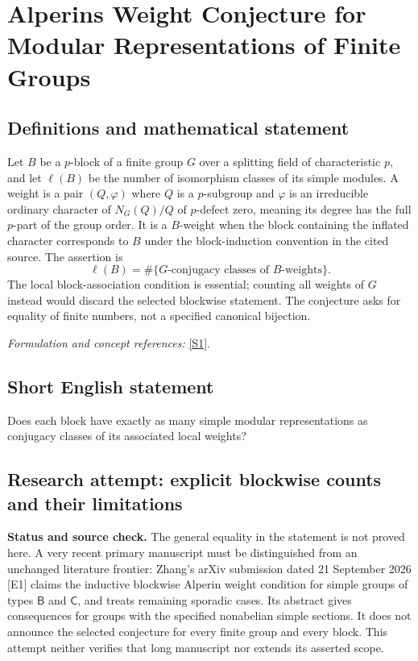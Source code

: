 \documentclass[11pt]{article}
\begin{document}
\section*{\texorpdfstring{Alperins Weight Conjecture for Modular Representations of Finite Groups}{Alperins Weight Conjecture for Modular Representations of Finite Groups}}\label{statement}
\subsection{Definitions and mathematical statement}
Let $B$ be a $p$-block of a finite group $G$ over a splitting field of characteristic $p$, and let $\ell(B)$ be the number of isomorphism classes of its simple modules. A weight is a pair $(Q,\varphi)$ where $Q$ is a $p$-subgroup and $\varphi$ is an irreducible ordinary character of $N_G(Q)/Q$ of $p$-defect zero, meaning its degree has the full $p$-part of the group order. It is a $B$-weight when the block containing the inflated character corresponds to $B$ under the block-induction convention in the cited source. The assertion is
\[
 \ell(B)=\#\{G\text{-conjugacy classes of }B\text{-weights}\}.
\]
The local block-association condition is essential; counting all weights of $G$ instead would discard the selected blockwise statement. The conjecture asks for equality of finite numbers, not a specified canonical bijection.
\par\smallskip\textit{Formulation and concept references:} \href{https://par.nsf.gov/servlets/purl/10275354}{[S1]}.

\subsection{Short English statement}
Does each block have exactly as many simple modular representations as conjugacy classes of its associated local weights?
\subsection{Research attempt: explicit blockwise counts and their limitations}
\textbf{Status and source check.} The general equality in the statement is not proved here. A very recent primary manuscript must be distinguished from an unchanged literature frontier: Zhang's arXiv submission dated 21 September 2026 [E1] claims the inductive blockwise Alperin weight condition for simple groups of types $\mathsf B$ and $\mathsf C$, and treats remaining sporadic cases. Its abstract gives consequences for groups with the specified nonabelian simple sections. It does not announce the selected conjecture for every finite group and every block. This attempt neither verifies that long manuscript nor extends its asserted scope.
\end{document}
